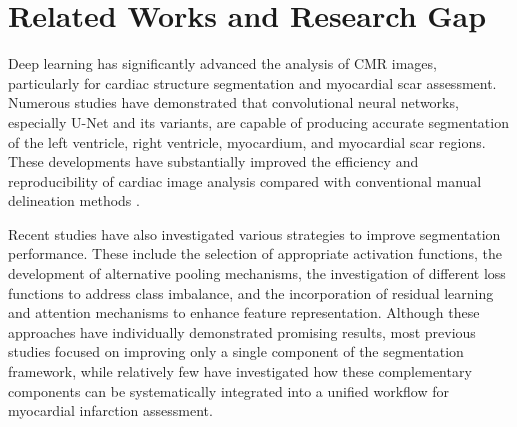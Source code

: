 \section{Related Works and Research Gap}
\label{sec:related-work}

Deep learning has significantly advanced the analysis of CMR images, particularly for cardiac structure segmentation and myocardial scar assessment. Numerous studies have demonstrated that convolutional neural networks, especially U-Net and its variants, are capable of producing accurate segmentation of the left ventricle, right ventricle, myocardium, and myocardial scar regions. These developments have substantially improved the efficiency and reproducibility of cardiac image analysis compared with conventional manual delineation methods \citep{Ronneberger2015,Bernard2018,Chen2020Review}.

Recent studies have also investigated various strategies to improve segmentation performance. These include the selection of appropriate activation functions, the development of alternative pooling mechanisms, the investigation of different loss functions to address class imbalance, and the incorporation of residual learning and attention mechanisms to enhance feature representation. Although these approaches have individually demonstrated promising results, most previous studies focused on improving only a single component of the segmentation framework, while relatively few have investigated how these complementary components can be systematically integrated into a unified workflow for myocardial infarction assessment.

